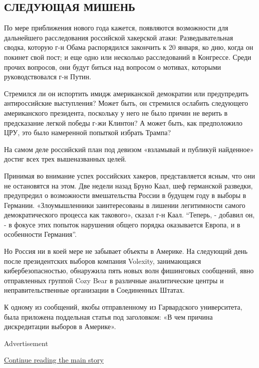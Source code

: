\hypertarget{ux441ux43bux435ux434ux443ux44eux449ux430ux44f-ux43cux438ux448ux435ux43dux44c}{%
\subsection{\texorpdfstring{\textbf{СЛЕДУЮЩАЯ
МИШЕНЬ}}{СЛЕДУЮЩАЯ МИШЕНЬ}}\label{ux441ux43bux435ux434ux443ux44eux449ux430ux44f-ux43cux438ux448ux435ux43dux44c}}

По мере приближения нового года кажется, появляются возможности для
дальнейшего расследования российской хакерской атаки: Разведывательная
сводка, которую г-н Обама распорядился закончить к 20 января, ко дню,
когда он покинет свой пост; и еще одно или несколько расследований в
Конгрессе. Среди прочих вопросов, они будут биться над вопросом о
мотивах, которыми руководствовался г-н Путин.

Стремился ли он испортить имидж американской демократии или предупредить
антироссийские выступления? Может быть, он стремился ослабить следующего
американского президента, поскольку у него не было причин не верить в
предсказание легкой победы г-жи Клинтон? А может быть, как предположило
ЦРУ, это было намеренной попыткой избрать Трампа?

На самом деле российский план под девизом «взламывай и публикуй
найденное» достиг всех трех вышеназванных целей.

Принимая во внимание успех российских хакеров, представляется ясным, что
они не остановятся на этом. Две недели назад Бруно Каал, шеф германской
разведки, предупредил о возможности вмешательства России в будущем году
в выборы в Германии. «Злоумышленники заинтересованы в лишении
легитимности самого демократического процесса как такового», сказал г-н
Каал. ``Теперь, - добавил он, - в фокусе этих попыток нарушения общего
порядка оказывается Европа, и в особенности Германия''.

Но Россия ни в коей мере не забывает объекты в Америке. На следующий
день после президентских выборов компания Volexity, занимающаяся
кибербезопасностью, обнаружила пять новых волн фишинговых сообщений,
явно отправленных группой Cozy Bear в различные аналитические центры и
неправительственные организации в Соединенных Штатах.

К одному из сообщений, якобы отправленному из Гарвардского университета,
была приложена поддельная статья под заголовком: «В чем причина
дискредитации выборов в Америке».

Advertisement

\protect\hyperlink{after-bottom}{Continue reading the main story}

